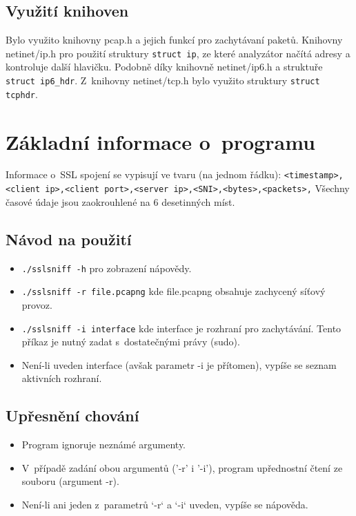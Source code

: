 \documentclass[a4paper, 12pt, titlepage]{article}
\begin{document}
\subsection{Využití knihoven}

Bylo využito knihovny pcap.h a jejich funkcí pro zachytávaní paketů. Knihovny netinet/ip.h pro použití struktury \verb|struct ip|, ze které analyzátor načítá adresy a kontroluje další hlavičku. Podobně díky knihovně netinet/ip6.h a struktuře \verb|struct ip6_hdr|. Z~knihovny netinet/tcp.h bylo využito struktury \verb|struct tcphdr|. 

\section{Základní informace o~programu}
Informace o~SSL spojení se vypisují ve tvaru (na jednom řádku): \newline 
\texttt{\small<timestamp>,<client ip>,<client port>,<server ip>,<SNI>,<bytes>,<packets>,}
\newline
Všechny časové údaje jsou zaokrouhlené na 6 desetinných míst.

\subsection{Návod na použití}
\begin{itemize}
  \item \verb|./sslsniff -h| pro zobrazení nápovědy.
  \item \verb|./sslsniff -r file.pcapng| kde file.pcapng obsahuje zachycený síťový provoz.
  \item \verb|./sslsniff -i interface| kde interface je rozhraní pro zachytávání. Tento příkaz je nutný zadat s~dostatečnými právy (sudo).
  \item Není-li uveden interface (avšak parametr -i je přítomen), vypíše se seznam aktivních rozhraní.
\end{itemize}

\subsection{Upřesnění chování}
\begin{itemize}
    \item Program ignoruje neznámé argumenty.
    \item V~případě zadání obou argumentů ('-r' i '-i'), program upřednostní čtení ze souboru (argument -r).
    \item Není-li ani jeden z~parametrů `-r` a `-i` uveden, vypíše se nápověda. 
\end{itemize}
\end{document}
